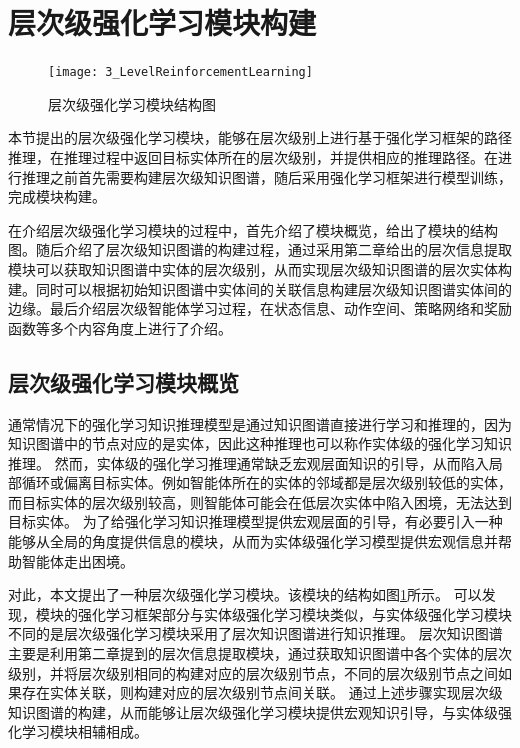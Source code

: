 \documentclass[algorithmlist, AutoFakeBold, AutoFakeSlant, figurelist, tablelist, nomlist, engineering]{seuthesix}
\begin{document}

\section{层次级强化学习模块构建}
\begin{figure}[t]
  \centering
  \texttt{[image: 3\_LevelReinforcementLearning]}
  \caption{层次级强化学习模块结构图}
  \label{3_LevelReinforcementLearning}
\end{figure}
本节提出的层次级强化学习模块，能够在层次级别上进行基于强化学习框架的路径推理，在推理过程中返回目标实体所在的层次级别，并提供相应的推理路径。在进行推理之前首先需要构建层次级知识图谱，随后采用强化学习框架进行模型训练，完成模块构建。

在介绍层次级强化学习模块的过程中，首先介绍了模块概览，给出了模块的结构图。随后介绍了层次级知识图谱的构建过程，通过采用第二章给出的层次信息提取模块可以获取知识图谱中实体的层次级别，从而实现层次级知识图谱的层次实体构建。同时可以根据初始知识图谱中实体间的关联信息构建层次级知识图谱实体间的边缘。最后介绍层次级智能体学习过程，在状态信息、动作空间、策略网络和奖励函数等多个内容角度上进行了介绍。


\subsection{层次级强化学习模块概览}
通常情况下的强化学习知识推理模型是通过知识图谱直接进行学习和推理的，因为知识图谱中的节点对应的是实体，因此这种推理也可以称作实体级的强化学习知识推理。
然而，实体级的强化学习推理通常缺乏宏观层面知识的引导，从而陷入局部循环或偏离目标实体。例如智能体所在的实体的邻域都是层次级别较低的实体，而目标实体的层次级别较高，则智能体可能会在低层次实体中陷入困境，无法达到目标实体。
为了给强化学习知识推理模型提供宏观层面的引导，有必要引入一种能够从全局的角度提供信息的模块，从而为实体级强化学习模型提供宏观信息并帮助智能体走出困境。

对此，本文提出了一种层次级强化学习模块。该模块的结构如图\ref{3_LevelReinforcementLearning}所示。
可以发现，模块的强化学习框架部分与实体级强化学习模块类似，与实体级强化学习模块不同的是层次级强化学习模块采用了层次知识图谱进行知识推理。
层次知识图谱主要是利用第二章提到的层次信息提取模块，通过获取知识图谱中各个实体的层次级别，并将层次级别相同的构建对应的层次级别节点，不同的层次级别节点之间如果存在实体关联，则构建对应的层次级别节点间关联。
通过上述步骤实现层次级知识图谱的构建，从而能够让层次级强化学习模块提供宏观知识引导，与实体级强化学习模块相辅相成。
\end{document}

